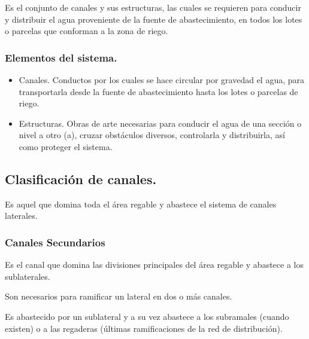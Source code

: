 \begin{definition}
	Es el conjunto de canales y sus
	estructuras, las cuales se requieren para conducir y distribuir el agua proveniente de la
	fuente de abastecimiento, en todos los lotes o parcelas que conforman a la zona de
	riego.
\end{definition}

\subsubsection{Elementos del sistema.}

\begin{itemize}
	\item Canales. Conductos por los cuales se hace circular por gravedad el agua, para
	      transportarla desde la fuente de abastecimiento hasta los lotes o parcelas de
	      riego.
	\item Estructuras. Obras de arte necesarias para conducir el agua de una sección o
	      nivel a otro (a), cruzar obstáculos diversos, controlarla y distribuirla, así como
	      proteger el sistema.
\end{itemize}

\subsection{Clasificación de canales.}

\begin{definition}
	Es aquel que domina toda el área regable y abastece el
	sistema de canales laterales.
\end{definition}

\subsubsection{Canales Secundarios}

\begin{definition}
	Es el canal que domina las divisiones principales del área
	regable y abastece a los sublaterales.
\end{definition}

\begin{definition}
	Son necesarios para ramificar un lateral en dos o
	más canales.
\end{definition}

\begin{definition}[ Ramal (CR).]
	Es abastecido por un sublateral y a su vez abastece a los
	subramales (cuando existen) o a las regaderas (últimas ramificaciones de la red de
	distribución).
\end{definition}

